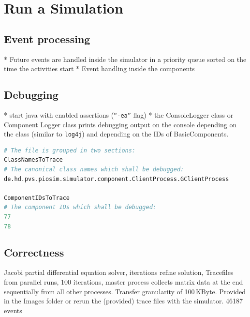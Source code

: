 \documentclass[
     11pt,         %
     a4paper,      %
     BCOR10mm,     %
     DIV14,        %
     liststotoc,   %
     bibtotoc,     %
     idxtotoc,     %
     parskip       %
     ]{scrreprt}   %
\begin{document}
\section{Run a Simulation}

\subsection{Event processing}
* Future events are handled inside the simulator in a priority queue sorted on the time the activities start
* Event handling inside the components

\subsection{Debugging}
* start java with enabled assertions (\texttt{"`-ea"'} flag)
* the ConsoleLogger class or Component Logger class prints debugging output on the console
depending on the class (similar to \texttt{log4j}) and depending on the IDs of BasicComponents.

\begin{lstlisting}[numbers=none,caption=Example debugging configuration file,label=
lst:debugConfigFile,language=Perl]
# The file is grouped in two sections:
ClassNamesToTrace
# The canonical class names which shall be debugged:
de.hd.pvs.piosim.simulator.component.ClientProcess.GClientProcess

ComponentIDsToTrace
# The component IDs which shall be debugged:
77
78
\end{lstlisting}

\subsection{Correctness}
Jacobi partial differential equation solver, iterations refine solution, Tracefiles from parallel runs, 100 iterations, master process collects matrix data at the end sequentially from all other processes.
Transfer granularity of 100\,KByte. Provided in the Images folder or rerun the (provided) trace files with the simulator. 
46187 events
\end{document}
